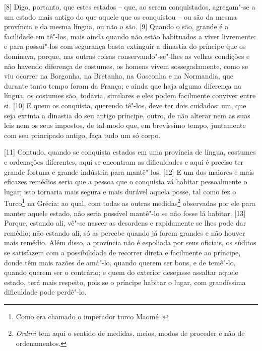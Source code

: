 {[}8{]} Digo, portanto, que estes estados -- que, ao serem conquistados,
agregam"-se a um estado mais antigo do que aquele que os conquistou -- ou
são da mesma província e da mesma língua, ou não o são. {[}9{]} Quando o
são, grande é a facilidade em tê"-los, mais ainda quando não estão
habituados a viver livremente: e para possuí"-los com segurança basta
extinguir a dinastia do príncipe que os dominava, porque, nas outras
coisas conservando"-se"-lhes as velhas condições e não havendo diferença
de costumes, os homens vivem sossegadamente, como se viu ocorrer na
Borgonha, na Bretanha, na Gasconha e na Normandia, que durante tanto
tempo foram da França; e ainda que haja alguma diferença na língua, os
costumes são, todavia, similares e eles podem facilmente conviver entre
si. {[}10{]} E quem os conquista, querendo tê"-los, deve ter dois
cuidados: um, que seja extinta a dinastia do seu antigo príncipe, outro,
de não alterar nem as suas leis nem os seus impostos, de tal modo que, em brevíssimo tempo,
juntamente com seu principado antigo, faça tudo um só corpo.

{[}11{]} Contudo, quando se conquista estados em uma província de
língua, costumes e ordenações diferentes, aqui se encontram as
dificuldades e aqui é preciso ter grande fortuna e grande indústria para
mantê"-los. {[}12{]} E um dos maiores e mais eficazes remédios seria que
a pessoa que o conquista vá habitar pessoalmente o lugar; isto tornaria
mais segura e mais durável aquela posse, tal como fez o Turco\footnote{Como
  era chamado o imperador turco Maomé .} na Grécia: ao qual, com todas
as outras medidas\footnote{\emph{Ordini} tem aqui o sentido de medidas,
  meios, modos de proceder e não de ordenamentos.} observadas por ele
para manter aquele estado, não seria possível mantê"-lo se não fosse lá
habitar. {[}13{]} Porque, estando ali, vê"-se nascer as desordens e
rapidamente se lhes pode dar remédio; não estando ali, só as percebe
quando já forem grandes e não houver mais remédio. Além disso, a
província não é espoliada por seus oficiais, os súditos se satisfazem
com a possibilidade de recorrer direta e facilmente ao príncipe, donde
têm mais razões de amá"-lo, quando querem ser bons, e de temê"-lo, quando
querem ser o contrário; e quem do exterior desejasse assaltar aquele
estado, terá mais respeito, pois se o príncipe habitar o lugar, com
grandíssima dificuldade pode perdê"-lo.

